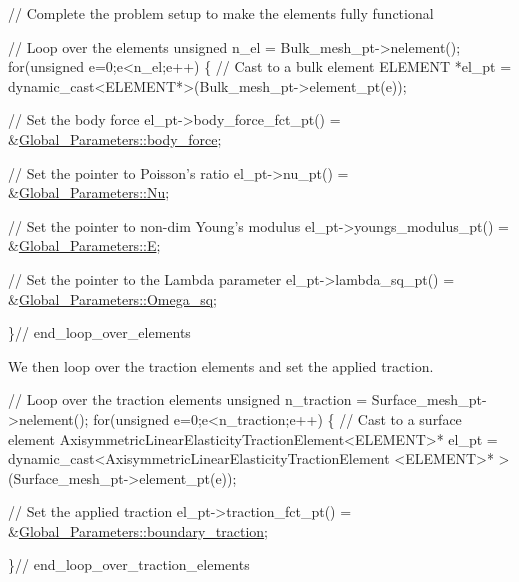 \begin{DoxyCodeInclude}

 \textcolor{comment}{// Complete the problem setup to make the elements fully functional}

 \textcolor{comment}{// Loop over the elements}
 \textcolor{keywordtype}{unsigned} n\_el = Bulk\_mesh\_pt->nelement();
 \textcolor{keywordflow}{for}(\textcolor{keywordtype}{unsigned} e=0;e<n\_el;e++)
  \{
   \textcolor{comment}{// Cast to a bulk element}
   ELEMENT *el\_pt = \textcolor{keyword}{dynamic\_cast<}ELEMENT*\textcolor{keyword}{>}(Bulk\_mesh\_pt->element\_pt(e));

   \textcolor{comment}{// Set the body force}
   el\_pt->body\_force\_fct\_pt() = &\hyperlink{namespaceGlobal__Parameters_a6459755c5d38e277ceddbf317c4ed179}{Global\_Parameters::body\_force};

   \textcolor{comment}{// Set the pointer to Poisson's ratio}
   el\_pt->nu\_pt() = &\hyperlink{namespaceGlobal__Parameters_a20fccdcfa2c15ad8b951b9ada3bb1661}{Global\_Parameters::Nu};

   \textcolor{comment}{// Set the pointer to non-dim Young's modulus}
   el\_pt->youngs\_modulus\_pt() = &\hyperlink{namespaceGlobal__Parameters_aa3dfbdb1b2fd80d516850f66c96b6fd0}{Global\_Parameters::E};

   \textcolor{comment}{// Set the pointer to the Lambda parameter}
   el\_pt->lambda\_sq\_pt() = &\hyperlink{namespaceGlobal__Parameters_af9e1e178dfb7f5e35b452599bd4c4324}{Global\_Parameters::Omega\_sq};

  \}\textcolor{comment}{// end\_loop\_over\_elements}

\end{DoxyCodeInclude}


We then loop over the traction elements and set the applied traction.


\begin{DoxyCodeInclude}

 \textcolor{comment}{// Loop over the traction elements}
 \textcolor{keywordtype}{unsigned} n\_traction =  Surface\_mesh\_pt->nelement();
 \textcolor{keywordflow}{for}(\textcolor{keywordtype}{unsigned} e=0;e<n\_traction;e++)
  \{
   \textcolor{comment}{// Cast to a surface element}
   AxisymmetricLinearElasticityTractionElement<ELEMENT>*
    el\_pt = 
    \textcolor{keyword}{dynamic\_cast<}AxisymmetricLinearElasticityTractionElement
    <ELEMENT\textcolor{keyword}{>}* >(Surface\_mesh\_pt->element\_pt(e));
   
   \textcolor{comment}{// Set the applied traction}
   el\_pt->traction\_fct\_pt() = &\hyperlink{namespaceGlobal__Parameters_a61ef31c4db13380658f6d5ea47c3369d}{Global\_Parameters::boundary\_traction};
   
  \}\textcolor{comment}{// end\_loop\_over\_traction\_elements}

\end{DoxyCodeInclude}


